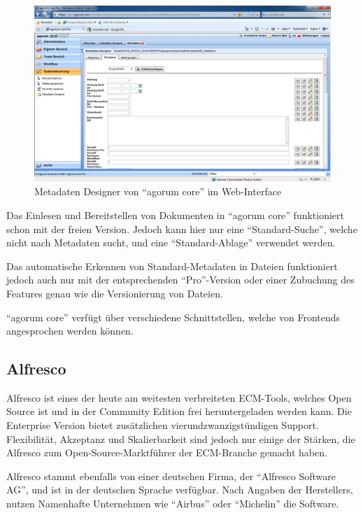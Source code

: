 \begin{figure}[!ht]
\centering
\includegraphics[width=16cm]{Bilder/agorum-core-metadatendesigner.png}
\caption{Metadaten Designer von "`agorum core"' im Web-Interface}
\label{metadatendesigner agorum}
\centering
\end{figure}

Das Einlesen und Bereitstellen von Dokumenten in "`agorum core"' funktioniert schon mit der freien Version. Jedoch kann hier nur eine "`Standard-Suche"', welche nicht nach Metadaten sucht, und eine "`Standard-Ablage"' verwendet werden. \cite{agorum_preise}

Das automatische Erkennen von Standard-Metadaten in Dateien funktioniert jedoch auch nur mit der entsprechenden "`Pro"'-Version oder einer Zubuchung des Features genau wie die Versionierung von Dateien.

"`agorum core"' verf\"ugt \"uber verschiedene Schnittstellen, welche von Frontends angesprochen werden k\"onnen. 

\subsection{Alfresco} \label{Alfresco}
Alfresco ist eines der heute am weitesten verbreiteten \ac{ECM}-Tools, welches Open Source ist und in der Community Edition frei heruntergeladen werden kann. Die Enterprise Version bietet zus\"atzlichen vierundzwanzigst\"undigen Support.
Flexibilit\"at, Akzeptanz und Skalierbarkeit sind jedoch nur einige der St\"arken, die Alfresco zum Open-Source-Marktf\"uhrer der \ac{ECM}-Branche gemacht haben. \cite{Alfresco_und_Liferay} \cite{Wiki_Alfresco} \cite{Alfresco_Implementation}

Alfresco stammt ebenfalls von einer deutschen Firma, der "`Alfresco Software AG"', und ist in der deutschen Sprache verf\"ugbar. Nach Angaben der Herstellers, nutzen Namenhafte Unternehmen wie "`Airbus"' oder "`Michelin"' die Software. \cite{Alfresco_Website}

